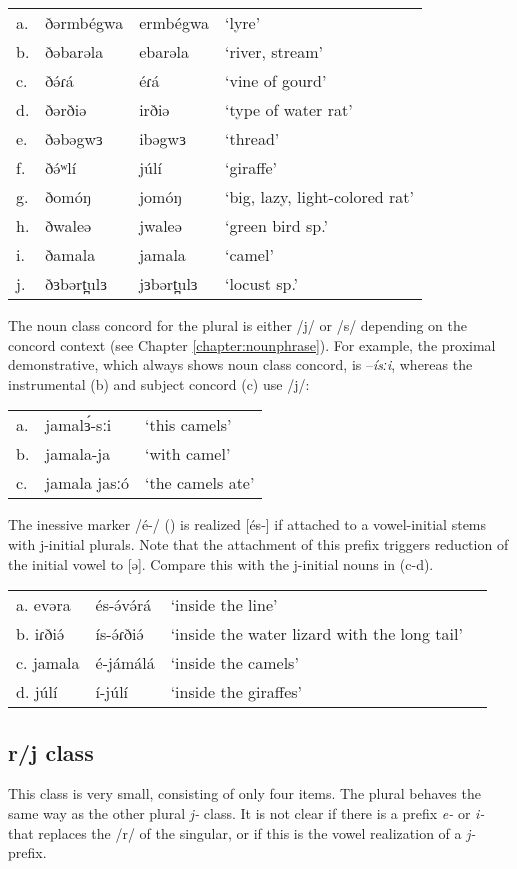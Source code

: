 \ea
\begin{tabular}[t]{llll}
a.	&	ðərmbégwa	&	ermbégwa		&	‘lyre’\\
b.	&	ðəbarəla	&	ebarəla		&	‘river, stream’\\
c.	&	ðə́ɾá			&	éɾá			&	‘vine of gourd’\\
d.	&	ðərðiə		&	irðiə		&	‘type of water rat’\\
e.	&	ðəbəgwɜ		&	ibəgwɜ		&	‘thread’\\
f.	&	ðə́ʷlí		&	júlí			&	‘giraffe’\\
g.	&	ðomóŋ		&	jomóŋ		&	‘big, lazy, light-colored rat’\\
h.	&	ðwaleə		&	jwaleə		&	‘green bird sp.’\\
i.	&	ðamala		&	jamala		&	‘camel’\\
j.	&	ðɜbərt̪ulɜ	&	jɜbərt̪ulɜ		&	‘locust sp.’ \\
\end{tabular}
\z

The noun class concord for the plural is either /j/ or /s/ depending on the concord context (see Chapter \ref{chapter:nounphrase}). For example, the proximal demonstrative, which always shows noun class concord, is –\textit{ísːi}, whereas the instrumental (b) and subject concord (c) use /j/:

\ea
\begin{tabular}[t]{lll}
	a.	&	jamalɜ́-sːi	&	‘this camels’\\
	b.	&	jamala-ja	&	‘with camel’\\
	c.	&	jamala jasːó&	‘the camels ate’\\
\end{tabular}
\z

The inessive marker /é-/ () is realized [és-] if attached to a vowel-initial stems with j-initial plurals. Note that the attachment of this prefix triggers reduction of the initial vowel to [ə]. Compare this with the j-initial nouns in (c-d). 
\ea
\begin{tabular}[t]{llll}
a.	evəra	&	és-ə́və́rá	&‘inside the line’\\
b.	iɾðiə́	&	ís-ə́ɾðiə́	&‘inside the water lizard with the long tail’\\
c.	jamala	&	é-jámálá	&‘inside the camels’\\
d.	júlí	&	í-júlí	&‘inside the giraffes’	\\
\end{tabular}
\z


\subsection{r/j class}
This class is very small, consisting of only four items. The plural behaves the same way as the other plural \textit{j-} class. It is not clear if there is a prefix \textit{e-} or \textit{i-} that replaces the /r/ of the singular, or if this is the vowel realization of a \textit{j-} prefix. 

